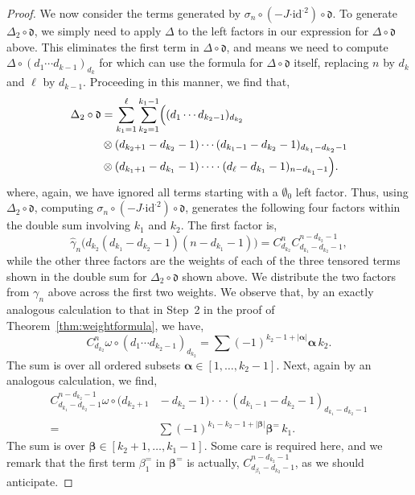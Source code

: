 \documentclass[5p,twocolumn]{elsarticle}
\newcommand*{\id}{{\mathrm{id}}}
\newcommand*{\df}{\mathfrak d}
\newcommand*{\cendot}{\boldsymbol{\cdot}}
\newcommand*{\balpha}{\boldsymbol{\alpha}}
\newcommand*{\bbeta}{\boldsymbol{\beta}}
\begin{document}
\begin{proof}
We now consider the terms generated by $\sigma_n\circ(-J\cendot\id^{\cendot2})\circ\df$.
To generate $\Delta_2\circ\df$, we simply need to apply $\Delta$ to the left factors in our expression for $\Delta\circ\df$ above.
This eliminates the first term in $\Delta\circ\df$, and means we need to compute $\Delta\circ(d_1\cdots d_{k-1})_{d_k}$ for which can use the formula for $\Delta\circ\df$ itself, replacing $n$ by $d_k$ and $\ell$ by $d_{k-1}$.
Proceeding in this manner, we find that,
\begin{align*}
\Delta_2\circ\df&=\sum_{k_1=1}^\ell\sum_{k_2=1}^{k_1-1}\Bigl((d_1\cdots d_{k_2-1})_{d_{k_2}}\\
&\otimes(d_{k_2+1}-d_{k_2}-1)\cdots(d_{k_1-1}-d_{k_2}-1)_{d_{k_1}-d_{k_2}-1}\\
&\otimes(d_{k_1+1}-d_{k_1}-1)\cdots\cdot(d_\ell-d_{k_1}-1)_{n-d_{k_1}-1}\Bigr).
\end{align*}
where, again, we have ignored all terms starting with a $\emptyset_0$ left factor.
Thus, using $\Delta_2\circ\df$, computing $\sigma_n\circ(-J\cendot\id^{\cendot2})\circ\df$, generates the following four factors within the double sum involving $k_1$ and $k_2$. 
The first factor is,
\begin{equation*}
\hat{\gamma}_n\bigl(d_{k_2}(d_{k_1}-d_{k_2}-1)(n-d_{k_1}-1)\bigr)=C_{d_{k_2}}^nC_{d_{k_1}-d_{k_2}-1}^{n-d_{k_2}-1},
\end{equation*}
while the other three factors are the weights of each of the three tensored terms shown in the double sum for $\Delta_2\circ\df$ shown above.
We distribute the two factors from $\gamma_n$ above across the first two weights.
We observe that, by an exactly analogous calculation to that in Step~2 in the proof of Theorem~\ref{thm:weightformula}, we have,
\begin{equation}\label{eq:mainstep3a}
    C_{d_{k_2}}^n\omega\circ(d_1\cdots d_{k_2-1})_{d_{k_2}}=\sum(-1)^{k_2-1+|\balpha|}\balpha\,k_2.
\end{equation}
The sum is over all ordered subsets $\balpha\in[1,\ldots,k_2-1]$. Next, again by an analogous calculation, we find,
\begin{align}
  C_{d_{k_1}-d_{k_2}-1}^{n-d_{k_2}-1}\omega\!\circ\!(d_{k_2+1}&\!-\!d_{k_2}\!-\!1)\!\cdot\!\cdot\!\cdot\!(d_{k_1-1}\!-\!d_{k_2}\!-\!1)_{d_{k_1}-d_{k_2}-1}\nonumber\\
  =&\sum(-1)^{k_1-k_2-1+|\bbeta|}\bbeta^=\,k_1.\label{eq:mainstep3b}
\end{align}
The sum is over $\bbeta\in[k_2+1,\ldots,k_1-1]$.
Some care is required here, and we remark that the first term $\beta_1^=$ in $\bbeta^=$ is actually, $C_{d_{\beta_1}-d_{k_2}-1}^{n-d_{k_2}-1}$, as we should anticipate.

\end{proof}
\end{document}
